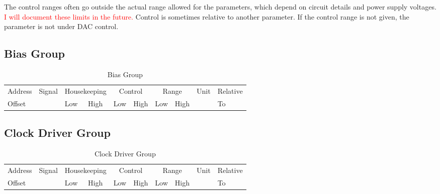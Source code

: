 \documentclass[12pt]{article}
\let\oldsubsection\subsection
\renewcommand{\subsection}{\FloatBarrier\oldsubsection}
\begin{document}
The control ranges often go outside the actual range allowed for the parameters, which depend on circuit details and power supply voltages. \textcolor{red}{I will document these limits in the future.} Control is sometimes relative to another parameter. If the control range is not given, the parameter is not under DAC control.
\subsection{Bias Group}
\begin{table}[ht!]
\caption{Bias Group}
\begin{tabular}{|l|l|l|l|l|l|l|l|l|l|}
\hline
Address & Signal & \multicolumn{2}{c|}{Housekeeping} &  \multicolumn{2}{c|}{Control} &  \multicolumn{2}{c|}{Range} &Unit & Relative \\
Offset &  & Low & High & Low & High & Low & High &  & To  \\
\hline

\hline
\end{tabular}
\vspace{5pt}

\label{biastab}
\end{table}

\subsection{Clock Driver Group}
\begin{table}[ht!]
\caption{Clock Driver Group}
\begin{tabular}{|l|l|l|l|l|l|l|l|l|l|}
\hline
Address & Signal & \multicolumn{2}{c|}{Housekeeping} &  \multicolumn{2}{c|}{Control} &  \multicolumn{2}{c|}{Range} &Unit & Relative \\
Offset &  & Low & High & Low & High & Low & High &  & To  \\

\hline

\hline
\end{tabular}
\vspace{5pt}

\label{clocktab}
\end{table}
\end{document}
